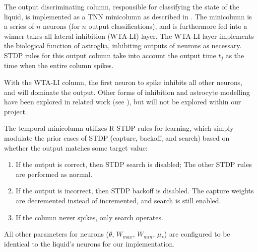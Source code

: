 The output discriminating column, responsible for classifying the state of the
liquid, is implemented as a TNN minicolumn as described in \cite{TNN}. The
minicolumn is a series of $n$ neurons (for $n$ output classifications), and is
furthermore fed into a winner-takes-all lateral inhibition (WTA-LI) layer. The
WTA-LI layer implements the biological function of astroglia, inhibiting outputs
of neurons as necessary. STDP rules for this output column take into account the
output time $t_j$ as the time when the entire column spikes.

With the WTA-LI column, the first neuron to spike inhibits all other neurons,
and will dominate the output. Other forms of inhibition and astrocyte modelling
have been explored in related work (see \cite{Astrocyte}), but will not be
explored within our project.

The temporal minicolumn utilizes R-STDP rules for learning, which simply
modulate the prior cases of STDP (capture, backoff, and search) based on whether
the output matches some target value:

\begin{enumerate}
    \item If the output is correct, then STDP search is disabled; The other
          STDP rules are performed as normal.
    \item If the output is incorrect, then STDP backoff is disabled. The capture
          weights are decremented instead of incremented, and search is still enabled.
    \item If the column never spikes, only search operates.
\end{enumerate}

All other parameters for neurons ($\theta$, $W_{max}$, $W_{min}$, $\mu_*$) are
configured to be identical to the liquid's neurons for our implementation.